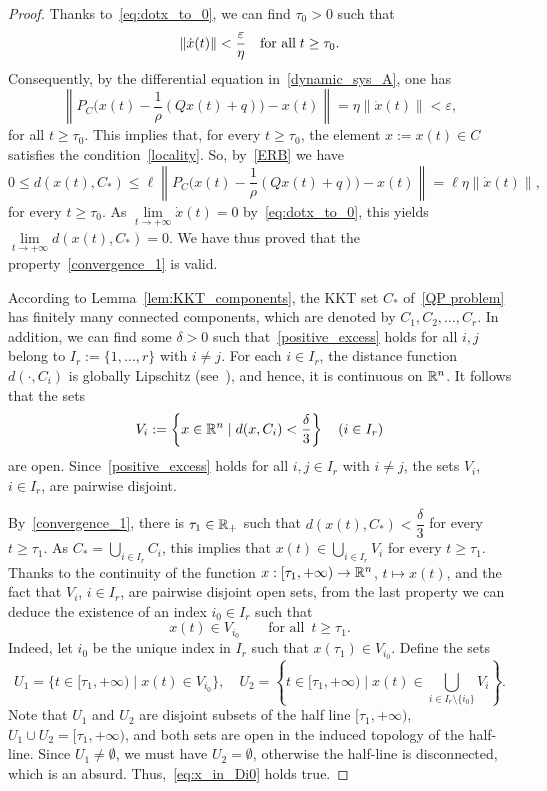 \documentclass[11pt]{article}
\theoremstyle{definition}
\theoremstyle{remark}
\def\R{\Bbb R}
\begin{document}
\begin{proof}
	  Thanks to~\eqref{eq:dotx_to_0}, we can find $\tau_0>0$ such that
	$$\|\dot{x}(t)\|< \dfrac{\varepsilon}{\eta}\quad\mbox{\rm for all}\; t\geq \tau_0.$$
Consequently, by the differential equation in~\eqref{dynamic_sys_A}, one has
	$$\left\|P_C\Big(x(t)-\frac{1}{\rho}(Qx(t)+q)\Big)-x(t)\right\|= \eta\|\dot{x}(t)\|< \varepsilon,$$
	for all $t\geq \tau_0$. This implies that, for every $t\geq \tau_0$, the element $x:=x(t)\in C$ satisfies the condition~\eqref{locality}. So, by~\eqref{ERB} we have 
	$$0\leq d(x(t),C_*)\leq \ell \left\|P_C\Big(x(t)-\frac{1}{\rho}(Qx(t)+q)\Big)-x(t)\right\| = \ell \eta \| \dot{x}(t)\|,$$
	for every $t\geq \tau_0$. As 
	$\lim\limits_{t\to+\infty}\dot{x}(t)=0$ by~\eqref{eq:dotx_to_0}, this yields~$\lim\limits_{t\to +\infty} d(x(t),C_*) = 0.$ We have thus proved that the property~\eqref{convergence_1} is valid. 
	
    According to Lemma~\ref{lem:KKT_components}, the KKT set $C_*$  of~\eqref{QP problem} has finitely many connected components, which are denoted by $C_1, C_2,\ldots, C_r$. In addition, we can find some $\delta >0$ such that~\eqref{positive_excess} holds for all $i, j$ belong to $I_r:=\{1,\ldots,r\}$ with $i\neq j$. For each $i\in I_r$, the distance function $d(\cdot, C_i)$ is globally Lipschitz (see~\cite[Proposition~2.4.1]{Clarke_1990}), and hence, it is continuous on $\R^n$. It follows that the sets
		$$V_i := \left\{x\in\R^n\mid d(x, C_i)<\dfrac{\delta}{3}\right\}\quad (i\in I_r)$$
	are open. Since~\eqref{positive_excess} holds for all $i, j\in I_r$ with $i\neq j$, the sets $V_i$, $i\in I_r$, are pairwise disjoint. 
	
	By~\eqref{convergence_1}, there is $\tau_1\in \R_+$ such that  $d(x(t),C_*)<\dfrac{\delta}{3}$ for every $t\geq \tau_1$. As $C_*=\bigcup\limits_{i\in I_r} C_i$, this implies that
	 $x(t)\in \bigcup\limits_{i\in I_r} V_i$ for every $t\geq \tau_1$. Thanks to the continuity of the function  $x:[\tau_1,+\infty)\to\R^n$, $t\mapsto x(t)$, and the fact that $V_i$, $i\in I_r$, are pairwise disjoint open sets, from the last property we can deduce the existence of an index $i_0\in I_r$ such that \begin{equation}\label{eq:x_in_Di0}
	 	x(t)\in V_{i_0}\qquad\text{for all }\, t\geq \tau_1.
	 \end{equation} Indeed, let $i_0$ be the unique index in $I_r$ such that $x(\tau_1)\in V_{i_0}$. Define the sets
	 $$U_1=\Big\{t\in [\tau_1,+\infty)\mid x(t)\in V_{i_0}\Big\},\quad U_2=\left\{t\in [\tau_1,+\infty)\mid x(t)\in \bigcup\limits_{i\in I_r\setminus\{i_0\}} V_i\right\}.$$ Note that $U_1$ and $U_2$ are disjoint subsets of the half line $[\tau_1,+\infty)$,  $U_1\cup U_2=[\tau_1,+\infty)$, and both sets are open in the induced topology of the half-line. Since $U_1\neq\emptyset$, we must have $U_2=\emptyset$, otherwise the half-line is disconnected, which is an absurd. Thus,~\eqref{eq:x_in_Di0} holds true.
	 

\end{proof}
\end{document}

